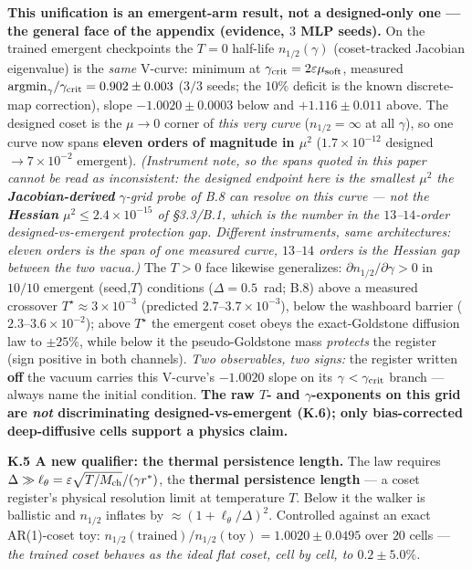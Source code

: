 \documentclass[10pt]{article}
\begin{document}
\textbf{This unification is an emergent-arm result, not a designed-only one --- the general face of the appendix (evidence, $3$ MLP seeds).} On the trained emergent checkpoints the $T=0$ half-life $n_{1/2}(\gamma)$ (coset-tracked Jacobian eigenvalue) is the \emph{same} V-curve: minimum at $\gamma_{\rm crit}=2\varepsilon\mu_{\rm soft}$, measured $\mathrm{argmin}_\gamma/\gamma_{\rm crit}=0.902\pm0.003$ ($3/3$ seeds; the $10\%$ deficit is the known discrete-map correction), slope $-1.0020\pm0.0003$ below and $+1.116\pm0.011$ above. The designed coset is the $\mu\to0$ corner of \emph{this very curve} ($n_{1/2}=\infty$ at all $\gamma$), so one curve now spans \textbf{eleven orders of magnitude in $\mu^2$} ($1.7{\times}10^{-12}$ designed $\to7{\times}10^{-2}$ emergent). \emph{(Instrument note, so the spans quoted in this paper cannot be read as inconsistent: the designed endpoint here is the smallest $\mu^2$ the \textbf{Jacobian-derived} $\gamma$-grid probe of B.8 can resolve on this curve --- not the \textbf{Hessian} $\mu^2\le2.4{\times}10^{-15}$ of \S3.3/B.1, which is the number in the $13$--$14$-order designed-vs-emergent protection gap. Different instruments, same architectures: eleven orders is the span of one measured curve, $13$--$14$ orders is the Hessian gap between the two vacua.)} The $T>0$ face likewise generalizes: $\partial n_{1/2}/\partial\gamma>0$ in $10/10$ emergent (seed,$T$) conditions ($\Delta=0.5$~rad; B.8) above a measured crossover $T^\star\approx3{\times}10^{-3}$ (predicted $2.7$--$3.7{\times}10^{-3}$), below the washboard barrier ($2.3$--$3.6{\times}10^{-2}$); above $T^\star$ the emergent coset obeys the exact-Goldstone diffusion law to $\pm25\%$, while below it the pseudo-Goldstone mass \emph{protects} the register (sign positive in both channels). \emph{Two observables, two signs:} the register written \textbf{off} the vacuum carries this V-curve's $-1.0020$ slope on its $\gamma<\gamma_{\rm crit}$ branch --- always name the initial condition. \textbf{The raw $T$- and $\gamma$-exponents on this grid are \emph{not} discriminating designed-vs-emergent (K.6); only bias-corrected deep-diffusive cells support a physics claim.}

\textbf{K.5 A new qualifier: the thermal persistence length.} The law requires $\Delta\gg\ell_\theta=\varepsilon\sqrt{T/M_{\rm ch}}/(\gamma r^*)$, the \textbf{thermal persistence length} --- a coset register's physical resolution limit at temperature $T$. Below it the walker is ballistic and $n_{1/2}$ inflates by $\approx(1+\ell_\theta/\Delta)^2$. Controlled against an exact AR(1)-coset toy: $n_{1/2}(\text{trained})/n_{1/2}(\text{toy})=1.0020\pm0.0495$ over $20$ cells --- \emph{the trained coset behaves as the ideal flat coset, cell by cell, to $0.2\pm5.0\%$.}
\end{document}
